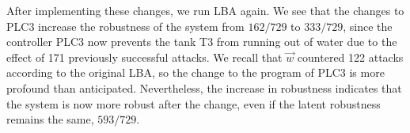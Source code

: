 {{After implementing these changes, we run LBA again. We see that the changes to PLC3 increase the robustness of the system from $162/729$ to $333/729$, since the controller PLC3 now prevents the tank T3 from running out of water due to the effect of 171 previously successful attacks. We recall that $\vec{w}$ countered 122 attacks according to the original LBA, so the change to the program of PLC3 is more profound than anticipated. Nevertheless, the increase in robustness indicates that the system is now more robust after the change, even if the latent robustness remains the same, $593/729$. 

 
}}
